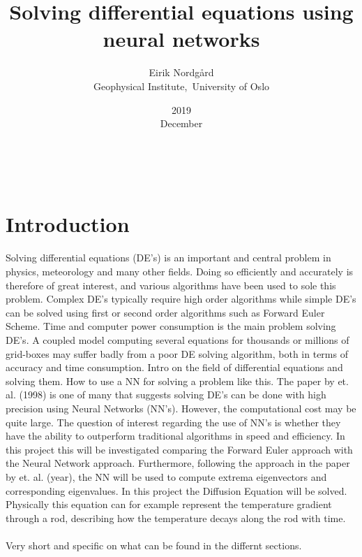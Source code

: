 \documentclass[a4paper,11pt,twocolumn]{article}
\begin{document}
\title{Solving differential equations using neural networks}
\date{2019\\ December}
\author{Eirik Nordgård\\ Geophysical Institute,\ University of Oslo}


\
\section{Introduction}

Solving differential equations (DE's) is an important and central problem in physics, meteorology and many other fields. Doing so efficiently and accurately is therefore of great interest, and various algorithms have been used to sole this problem. Complex DE's typically require high order algorithms while simple DE's can be solved using first or second order algorithms such as Forward Euler Scheme. Time and computer power consumption is the main problem solving DE's. A coupled model computing several equations for thousands or millions of grid-boxes may suffer badly from a poor DE solving algorithm, both in terms of accuracy and time consumption.  
Intro on the field of differential equations and solving them. How to use a NN for solving a problem like this. The paper by \cite{lagaris} et. al. (1998) is one of many that suggests solving DE's can be done with high precision using Neural Networks (NN's). However, the computational cost may be quite large. 
The question of interest regarding the use of NN's is whether they have the ability to outperform traditional algorithms in speed and efficiency. In this project this will be investigated comparing the Forward Euler approach with the Neural Network approach. Furthermore, following the approach in the paper by \cite{yi} et. al. (year), the NN will be used to compute extrema eigenvectors and corresponding eigenvalues. In this project the Diffusion Equation will be solved. Physically this equation can for example represent the temperature gradient through a rod, describing how the temperature decays along the rod with time.  
\\
\\
Very short and specific on what can be found in the differnt sections. 
\
\end{document}
